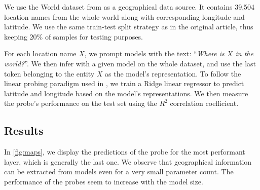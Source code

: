 We use the World dataset from \citet{gurnee2023language} as a geographical data source. It contains 39,504 location names from the whole world along with corresponding longitude and latitude. We use the same train-test split strategy as in the original article, thus keeping 20\% of samples for testing purposes.

For each location name $X$, we prompt models with the text: ``\textit{Where is $X$ in the world?}''. We then infer with a given model on the whole dataset, and use the last token belonging to the entity $X$ as the model's representation. To follow the linear probing paradigm used in \citet{gurnee2023language}, we train a Ridge linear regressor \citep{ridge} to predict latitude and longitude based on the model's representations. We then measure the probe's performance on the test set using the $R^2$ correlation coefficient.

\subsection{Results}
In \autoref{fig:maps}, we display the predictions of the probe for the most performant layer, which is generally the last one. We observe that geographical information can be extracted from models even for a very small parameter count. The performance of the probes seem to increase with the model size.

